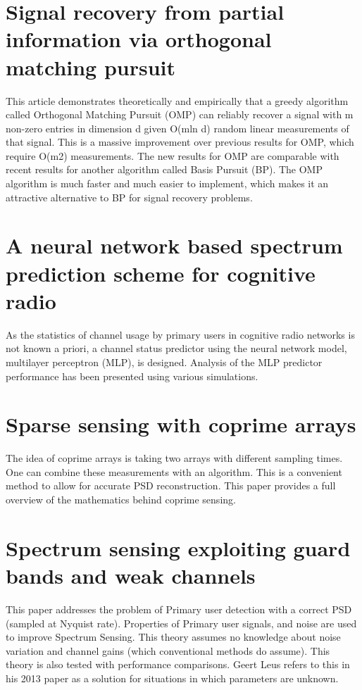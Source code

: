 \documentclass[report, oneside, a4paper, openany]{memoir}
\begin{document}
\section{Signal recovery from partial information via orthogonal matching pursuit \cite{tropp2005signal}}
This article demonstrates theoretically and empirically that a greedy algorithm called
Orthogonal Matching Pursuit (OMP) can reliably recover a signal with m non-zero entries in dimension
d given O(mln d) random linear measurements of that signal. This is a massive improvement
over previous results for OMP, which require O(m2) measurements. The new results for OMP are
comparable with recent results for another algorithm called Basis Pursuit (BP). The OMP algorithm
is much faster and much easier to implement, which makes it an attractive alternative to BP
for signal recovery problems.
\section{A neural network based spectrum prediction scheme for cognitive radio \cite{tumuluru2010neural}}
As the statistics of channel usage by primary users in cognitive radio networks is not known a priori, a channel status predictor using the neural network model, multilayer perceptron (MLP), is designed. Analysis of the MLP predictor performance has been presented using various simulations.
\section{Sparse sensing with coprime arrays \cite{vaidyanathan2010sparse}}
The idea of coprime arrays is taking two arrays with different sampling times. One can combine these measurements with an algorithm. This is a convenient method to allow for accurate PSD reconstruction. This paper provides a full overview of the mathematics behind coprime sensing.
\section{Spectrum sensing exploiting guard bands and weak channels \cite{vazquez2011spectrum}}
This paper addresses the problem of Primary user detection with a correct PSD (sampled at Nyquist rate). Properties of Primary user signals, and noise are used to improve Spectrum Sensing. This theory assumes no knowledge about noise variation and channel gains (which conventional methods do assume). This theory is also tested with performance comparisons. Geert Leus refers to this in his 2013 paper as a solution for situations in which parameters are unknown.
\end{document}
